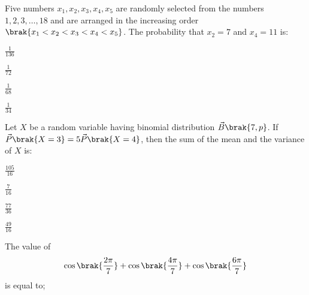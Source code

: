 \iffalse
\title{Assignment-2}
\author{EE24BTECH11049}
\section{mcq-single}
\fi

%
    
    \item 
    Five numbers $x_1, x_2, x_3, x_4, x_5$ are randomly selected from the numbers $1, 2, 3,\dots, 18$ and are arranged in the increasing order $\brak{x_1 < x_2 < x_3 < x_4 < x_5}$. The probability that $x_2 = 7$ and $x_4 = 11$ is:

    \hfill{}
    
    \begin{enumerate}
    \begin{multicols}{4}	
        \item $\frac{1}{136}$
        \item $\frac{1}{72}$
        \item $\frac{1}{68}$
        \item $\frac{1}{34}$
    \end{multicols}
    \end{enumerate}

    \item 
    Let $X$ be a random variable having binomial distribution $\vec{B}\brak{7, p}$. If $\vec{P}\brak{X = 3} = 5\vec{P}\brak{X = 4}$, then the sum of the mean and the variance of $X$ is: 

    \hfill{}
    
    \begin{enumerate}
    \begin{multicols}{4}
        \item $\frac{105}{16}$
        \item $\frac{7}{16}$
        \item $\frac{77}{36}$
        \item $\frac{49}{16}$
    \end{multicols}
    \end{enumerate}

    \item 
    The value of 
    \begin{align*}
        \cos{\brak{\frac{2\pi}{7}}} + \cos{\brak{\frac{4\pi}{7}}} + \cos{\brak{\frac{6\pi}{7}}} 
    \end{align*}
    is equal to;

